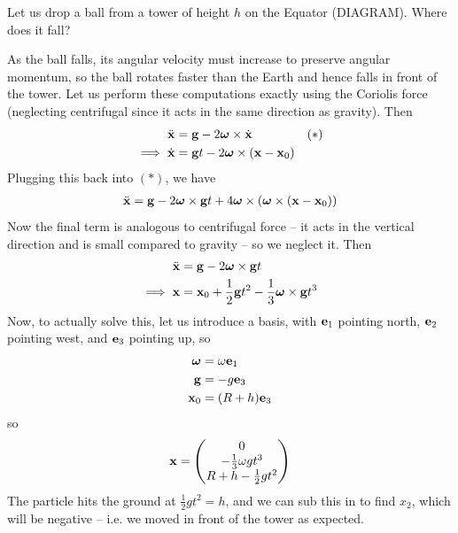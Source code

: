 \documentclass{../../template/note}
\begin{document}
    \begin{example*}
        Let us drop a ball from a tower of height \(h\) on the Equator (DIAGRAM). Where does it fall?

        As the ball falls, its angular velocity must increase to preserve angular momentum, so the ball rotates faster than the Earth and hence falls in front of the tower. Let us perform these computations exactly using the Coriolis force (neglecting centrifugal since it acts in the same direction as gravity). Then
        \begin{align*}
            \ddot{\V x} &= \V g - 2 \V \omega \times \dot{\V x}  && (*)\\
            \implies \dot{\V x} &= \V g t - 2 \V \omega \times (\V x - \V x_0)
        \end{align*}
        Plugging this back into \((*)\), we have
        \begin{align*}
            \ddot{\V x} = \V g - 2 \V \omega \times \V g t + 4 \V \omega \times (\V \omega \times (\V x - \V x_0))
        \end{align*}
        Now the final term is analogous to centrifugal force -- it acts in the vertical direction and is small compared to gravity -- so we neglect it. Then
        \begin{align*}
            \ddot{\V x} &= \V g - 2 \V \omega \times \V g t \\
            \implies \V x &= \V x_0 + \frac 1 2 \V g t^2 - \frac 1 3 \V \omega \times \V g t^3
        \end{align*}
        Now, to actually solve this, let us introduce a basis, with \(\V e_1\) pointing north, \(\V e_2\) pointing west, and \(\V e_3\) pointing up, so
        \begin{align*}
            \V \omega &= \omega \V e_1 \\
            \V g &= -g \V e_3 \\
            \V x_0 &= (R+h) \V e_3
        \end{align*}
        so
        \begin{align*}
            \V x = \begin{pmatrix}
             0 \\
             -\frac 1 3 \omega gt^3 \\
             R + h - \frac 1 2 gt^2 \\
            \end{pmatrix}
        \end{align*}
        The particle hits the ground at \(\frac 1 2 gt^2 = h\), and we can sub this in to find \(x_2\), which will be negative -- i.e. we moved in front of the tower as expected.
    \end{example*}
    
\end{document}
